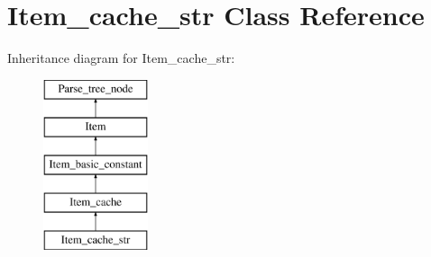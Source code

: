 \hypertarget{classItem__cache__str}{}\section{Item\+\_\+cache\+\_\+str Class Reference}
\label{classItem__cache__str}
Inheritance diagram for Item\+\_\+cache\+\_\+str\+:\begin{figure}[H]
\begin{center}
\leavevmode
\includegraphics[height=5.000000cm]{classItem__cache__str}
\end{center}
\end{figure}
